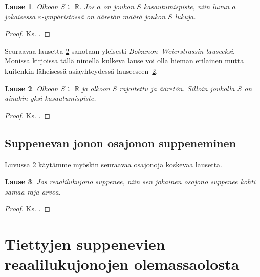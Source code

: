 \documentclass[a4paper,12pt,leqno,oneside]{report} %
\theoremstyle{plain}
\newtheorem{lause}{Lause}[chapter]
\theoremstyle{definition}
\theoremstyle{remark}
\numberwithin{equation}{chapter}
\newcommand*{\Rset}{\mathbb{R}}  %
\begin{document}
\begin{lause}\label{thm: kasautumispisteen ympäristössä}
Olkoon $S\subseteq\Rset$. Jos $a$ on joukon $S$ kasautumispiste, niin luvun $a$ jokaisessa $\varepsilon$-ympäristössä on ääretön määrä joukon $S$ lukuja.
\end{lause}

\begin{proof}
Ks. \cite[s. 37]{Mathman}.
\end{proof}

Seuraavaa lausetta \ref{Bolzanon--Weierstrassin lause} sanotaan yleisesti \emph{Bolzanon--Weierstrassin lauseeksi}. Monissa kirjoissa tällä nimellä kulkeva lause voi olla hieman erilainen mutta kuitenkin läheisessä asiayhteydessä lauseeseen~\ref{Bolzanon--Weierstrassin lause}.

\begin{lause}\label{Bolzanon--Weierstrassin lause}
Olkoon $S\subseteq\Rset$ ja olkoon $S$ rajoitettu ja ääretön. Silloin joukolla $S$ on ainakin yksi kasautumispiste.
\end{lause}

\begin{proof}
Ks. \cite[s. 39]{Mathman}.
\end{proof}


\section{Suppenevan jonon osajonon suppeneminen}

Luvussa \ref{ch: Tiettyjen suppenevien} käytämme myöskin seuraavaa osajonoja koskevaa lausetta.

\begin{lause}\label{osajonoja koskeva lause}
Jos reaalilukujono suppenee, niin sen jokainen osajono suppenee kohti samaa raja-arvoa.
\end{lause}

\begin{proof}
Ks. \cite[s. 43]{Mathman}.
\end{proof}


\chapter[Tiettyjen suppenevien reaalilukujonojen olemassaolosta]{Tiettyjen suppenevien\\ reaalilukujonojen olemassaolosta}\label{ch: Tiettyjen suppenevien}
\end{document}
